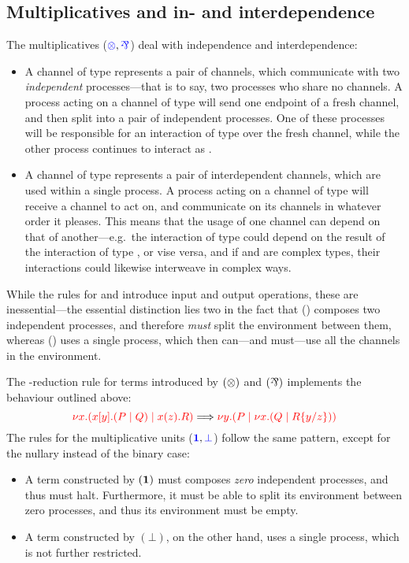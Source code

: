\subsection{Multiplicatives and in- and interdependence}
\label{sec:cp-dependence}
The multiplicatives ($\ty{\tens}, \ty{\parr}$) deal with independence and
interdependence:
\begin{itemize}
\item
  A channel of type  represents a pair of channels, which
  communicate with two \emph{independent} processes---that is to say, two
  processes who share no channels.
  A process acting on a channel of type  will send one endpoint of
  a fresh channel, and then split into a pair of independent processes.
  One of these processes will be responsible for an interaction of type 
  over the fresh channel, while the other process continues to interact as
  .
\item
  A channel of type  represents a pair of interdependent channels,
  which are used within a single process.
  A process acting on a channel of type  will receive a channel to
  act on, and communicate on its channels in whatever order it pleases.
  This means that the usage of one channel can depend on that of
  another---e.g.\ the interaction of type  could depend on the result of
  the interaction of type , or vise versa, and if  and  are
  complex types, their interactions could likewise interweave in complex ways.
\end{itemize}
While the rules for \ty{\tens} and \ty{\parr} introduce input and output
operations, these are inessential---the essential distinction lies two in the
fact that (\tens) composes two independent processes, and therefore \emph{must}
split the environment between them, whereas (\parr) uses a single process, which
then can---and must---use all the channels in the environment.
\begin{center}
  \cpInfTens
  \cpInfParr
\end{center}
The \textbeta-reduction rule for terms introduced by $(\tens)$ and $(\parr)$
implements the behaviour outlined above:
\[
  \tm{\cpCut{x}{\cpSend{x}{y}{P}{Q}}{\cpRecv{x}{z}{R}}}
  \Longrightarrow
  \tm{\cpCut{y}{P}{\cpCut{x}{Q}{\cpSub{y}{z}{R}}}}
\]
%
The rules for the multiplicative units ($\ty{\one}, \ty{\bot}$) follow the same
pattern, except for the nullary instead of the binary case:
\begin{itemize}
\item
  A term constructed by $(\one)$ must composes \emph{zero} independent
  processes, and thus must halt. Furthermore, it must be able to split its
  environment between zero processes, and thus its environment must be empty.
\item
  A term constructed by $(\bot)$, on the other hand, uses a single process,
  which is not further restricted.
\end{itemize}
